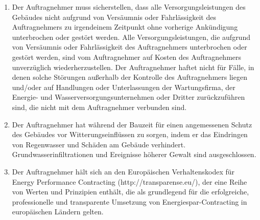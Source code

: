 \begin{multicols}{2}
\begin{enumerate}
   \item Der Auftragnehmer muss sicherstellen, dass alle Versorgungsleistungen des Gebäudes nicht aufgrund von Versäumnis oder Fahrlässigkeit des Auftragnehmers zu irgendeinem Zeitpunkt ohne vorherige Ankündigung unterbrochen oder gestört werden. Alle Versorgungsleistungen, die aufgrund von Versäumnis oder Fahrlässigkeit des Auftragnehmers unterbrochen oder gestört werden, sind vom Auftragnehmer auf Kosten des Auftragnehmers unverzüglich wiederherzustellen. Der Auftragnehmer haftet nicht für Fälle, in denen solche Störungen außerhalb der Kontrolle des Auftragnehmers liegen und/oder auf Handlungen oder Unterlassungen der Wartungsfirma, der Energie- und Wasserversorgungsunternehmen oder Dritter zurückzuführen sind, die nicht mit dem Auftragnehmer verbunden sind.
   \item Der Auftragnehmer hat während der Bauzeit für einen angemessenen Schutz des Gebäudes vor Witterungseinflüssen zu sorgen, indem er das Eindringen von Regenwasser und Schäden am Gebäude verhindert. Grundwasserinfiltrationen und Ereignisse höherer Gewalt sind ausgeschlossen.
   \item Der Auftragnehmer hält sich an den Europäischen Verhaltenskodex für Energy Performance Contracting (http://transparense.eu/), der eine Reihe von Werten und Prinzipien enthält, die als grundlegend für die erfolgreiche, professionelle und transparente Umsetzung von Energiespar-Contracting in europäischen Ländern gelten.
  \end{enumerate}


\end{multicols}
